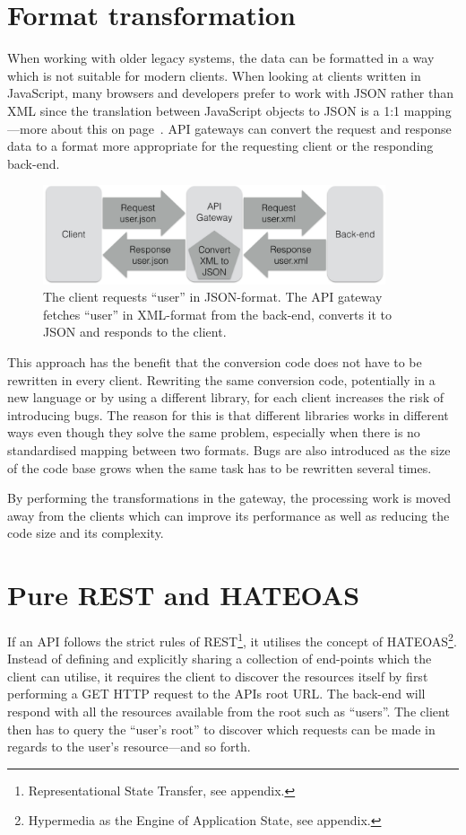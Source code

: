 \documentclass{cslthse-msc}
\begin{document}
\section{Format transformation}
When working with older legacy systems, the data can be formatted in a way which is not suitable for modern clients. When looking at clients written in JavaScript, many browsers and developers prefer to work with JSON rather than XML since the translation between JavaScript objects to JSON is a 1:1 mapping---more about this on page~\pageref{xml_json}. API gateways can convert the request and response data to a format more appropriate for the requesting client or the responding back-end.

\begin{figure}[H]
  \centering
    \begin{center}
      \includegraphics[width=0.9\textwidth]{images/api_gateway_transform.png}
    \end{center}
  \caption{The client requests \enquote{user} in JSON-format. The API gateway fetches \enquote{user} in XML-format from the back-end, converts it to JSON and responds to the client.}
\end{figure}

This approach has the benefit that the conversion code does not have to be rewritten in every client. Rewriting the same conversion code, potentially in a new language or by using a different library, for each client increases the risk of introducing bugs. The reason for this is that different libraries works in different ways even though they solve the same problem, especially when there is no standardised mapping between two formats. Bugs are also introduced as the size of the code base grows when the same task has to be rewritten several times\cite{code_complete}. 

By performing the transformations in the gateway, the processing work is moved away from the clients which can improve its performance as well as reducing the code size and its complexity.

\section{Pure REST and HATEOAS}
If an API follows the strict rules of REST\footnote{Representational State Transfer, see appendix.}, it utilises the concept of HATEOAS\footnote{Hypermedia as the Engine of Application State, see appendix.}. Instead of defining and explicitly sharing a collection of end-points which the client can utilise, it requires the client to discover the resources itself by first performing a GET HTTP request to the APIs root URL. The back-end will respond with all the resources available from the root such as \enquote{users}. The client then has to query the \enquote{user's root} to discover which requests can be made in regards to the user's resource---and so forth. 
\end{document}
